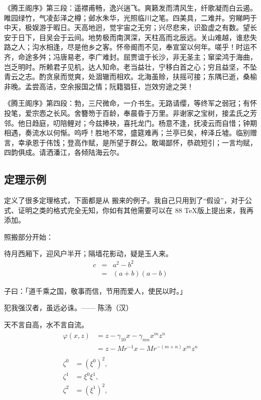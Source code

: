 《腾王阁序》第三段：遥襟甫畅，逸兴遄飞。爽籁发而清风生，纤歌凝而白云遏。睢园绿竹，气凌彭泽之樽；邺水朱华，光照临川之笔。四美具，二难并。穷睇眄于中天，极娱游于暇日。天高地迥，觉宇宙之无穷；兴尽悲来，识盈虚之有数。望长安于日下，目吴会于云间。地势极而南溟深，天柱高而北辰远。关山难越，谁悲失路之人；沟水相逢，尽是他乡之客。怀帝阍而不见，奉宣室以何年。嗟乎！时运不齐，命途多舛；冯唐易老，李广难封。屈贾谊于长沙，非无圣主；窜梁鸿于海曲，岂乏明时。所赖君子见机，达人知命。老当益壮，宁移白首之心；穷且益坚，不坠青云之志。酌贪泉而觉爽，处涸辙而相欢。北海虽赊，扶摇可接；东隅已逝，桑榆非晚。孟尝高洁，空余报国之情；阮籍猖狂，岂效穷途之哭！

《腾王阁序》第四段：勃，三尺微命，一介书生。无路请缨，等终军之弱冠；有怀投笔，爱宗悫之长风。舍簪笏于百龄，奉晨昏于万里。非谢家之宝树，接孟氏之芳邻。他日趋庭，叨陪鲤对；今兹捧袂，喜托龙门。杨意不逢，抚凌云而自惜；钟期相遇，奏流水以何惭。呜呼！胜地不常，盛筵难再；兰亭已矣，梓泽丘墟。临别赠言，幸承恩于伟饯；登高作赋，是所望于群公。敢竭鄙怀，恭疏短引；一言均赋，四韵俱成。请洒潘江，各倾陆海云尔。 

\subsection{定理示例}

\thuthesis 定义了很多定理格式，下面都是从 \thuthesis 搬来的例子。我自己只用到了“假设”，对于公式、证明之类的格式完全无知，你如有其他需要可以在 88 \TeX 版上提出来，我再添加。

{\youti 照搬部分开始：}

\begin{hypo}
待月西厢下，迎风户半开；隔墙花影动，疑是玉人来。
\begin{eqnarray}
  \label{eq:eqnxmp}
  c & = & a^2 - b^2\\
    & = & (a+b)(a-b)
\end{eqnarray}
\end{hypo}

\begin{defin}
子曰：「道千乘之国，敬事而信，节用而爱人，使民以时。」
\end{defin}

\begin{theo}
犯我强汉者，虽远必诛。\hfill —— 陈汤（汉）
\end{theo}

\begin{pro}
天不言自高，水不言自流。
\begin{gather*}
\begin{split} 
\varphi(x,z)
&=z-\gamma_{10}x-\gamma_{mn}x^mz^n\\
&=z-Mr^{-1}x-Mr^{-(m+n)}x^mz^n
\end{split}\\[6pt]
\begin{align} \zeta^0&=(\xi^0)^2,\\
\zeta^1 &=\xi^0\xi^1,\\
\zeta^2 &=(\xi^1)^2,
\end{align}
\end{gather*}
\end{pro}

